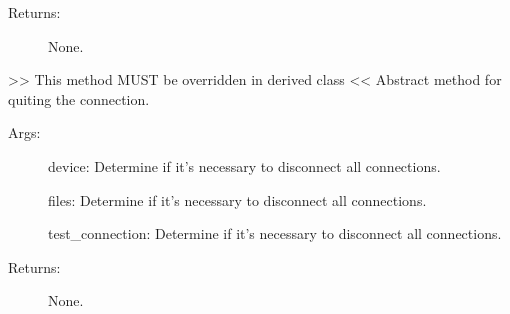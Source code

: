\documentclass[letterpaper,10pt,english]{sphinxmanual}
\begin{document}
\begin{fulllineitems}
\begin{fulllineitems}
\begin{description}
\item[{Returns:}] \leavevmode
\sphinxAtStartPar
None.

\end{description}

\end{fulllineitems}


\begin{fulllineitems}
\label{\detokenize{QConnectionLibrary:QConnectionLibrary.connection_base.ConnectionBase.config}}
\end{fulllineitems}


\begin{fulllineitems}
\label{\detokenize{QConnectionLibrary:QConnectionLibrary.connection_base.ConnectionBase.connect}}
\sphinxAtStartPar
\textgreater{}\textgreater{} This method MUST be overridden in derived class \textless{}\textless{}
Abstract method for quiting the connection.
\begin{description}
\item[{Args:}] \leavevmode
\sphinxAtStartPar
device: Determine if it’s necessary to disconnect all connections.

\sphinxAtStartPar
files: Determine if it’s necessary to disconnect all connections.

\sphinxAtStartPar
test\_connection: Determine if it’s necessary to disconnect all connections.

\item[{Returns:}] \leavevmode
\sphinxAtStartPar
None.

\end{description}

\end{fulllineitems}



\end{fulllineitems}
\end{document}
